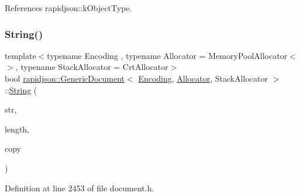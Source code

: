 References rapidjson\+::k\+Object\+Type.

\mbox{\label{classrapidjson_1_1_generic_document_aeab83624e94e75f3f9faa18e0c74ba20}} 
\subsubsection{\texorpdfstring{String()}{String()}}
{\footnotesize\ttfamily template$<$typename Encoding , typename Allocator  = Memory\+Pool\+Allocator$<$$>$, typename Stack\+Allocator  = Crt\+Allocator$>$ \\
bool \mbox{\hyperlink{classrapidjson_1_1_generic_document}{rapidjson\+::\+Generic\+Document}}$<$ \mbox{\hyperlink{classrapidjson_1_1_encoding}{Encoding}}, \mbox{\hyperlink{classrapidjson_1_1_allocator}{Allocator}}, Stack\+Allocator $>$\+::\mbox{\hyperlink{structrapidjson_1_1_generic_value_1_1_string}{String}} (\begin{DoxyParamCaption}\item[{const \mbox{\hyperlink{classrapidjson_1_1_generic_value_adcdbc7fa85a9a41b78966d7e0dcc2ac4}{Ch}} $\ast$}]{str,  }\item[{\mbox{\hyperlink{namespacerapidjson_a44eb33eaa523e36d466b1ced64b85c84}{Size\+Type}}}]{length,  }\item[{bool}]{copy }\end{DoxyParamCaption})}



Definition at line 2453 of file document.\+h.


